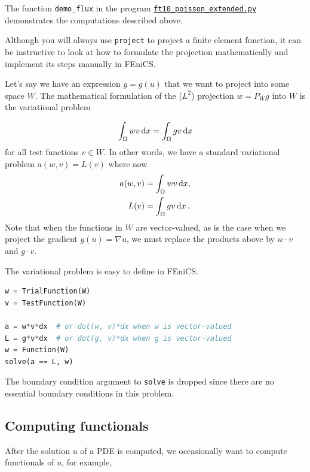 \documentclass[graybox,envcountchap,sectrefs,final]{svmonodo}
\newenvironment{notice_mdfboxadmon}[1][]{
\begin{notice_mdfboxmdframed}[frametitle=#1]
}
{
\end{notice_mdfboxmdframed}
}
\begin{document}
The function \Verb!demo_flux! in the program
\href{{https://fenicsproject.org/pub/tutorial/python/vol1/ft10_poisson_extended.py}}{\nolinkurl{ft10_poisson_extended.py}}
demonstrates the computations described above.


\begin{notice_mdfboxadmon}
Although you will always use \texttt{project} to project a finite element
function, it can be instructive to look at how to formulate the
projection mathematically and implement its steps manually in FEniCS.

Let's say we have an expression $g = g(u)$ that we want to project
into some space $W$. The mathematical formulation of the ($L^2$)
projection $w = P_W g$ into $W$ is the variational problem

\begin{equation}
  \int_{\Omega} w v \, \mathrm{d}x = \int_{\Omega} g v \, \mathrm{d}x
\end{equation}
for all test functions $v\in W$. In other words, we have a
standard variational problem $a(w, v) = L(v)$ where now
\begin{align}
a(w, v) &= \int_\Omega w v \, \mathrm{d}x,\\
L(v) &= \int_\Omega g v \, \mathrm{d}x\thinspace .
\end{align}
Note that when the functions in $W$ are vector-valued, as is the case
when we project the gradient $g(u) = \nabla u$, we must replace the
products above by $w\cdot v$ and $g\cdot v$.

The variational problem is easy to define in FEniCS.
\begin{lstlisting}[language=Python,style=graycolor]
w = TrialFunction(W)
v = TestFunction(W)

a = w*v*dx  # or dot(w, v)*dx when w is vector-valued
L = g*v*dx  # or dot(g, v)*dx when g is vector-valued
w = Function(W)
solve(a == L, w)
\end{lstlisting}
The boundary condition argument to \texttt{solve} is dropped since there are
no essential boundary conditions in this problem.
\end{notice_mdfboxadmon} %

\subsection{Computing functionals}
\label{ch:poisson0:functionals}

After the solution $u$ of a PDE is computed, we occasionally want to compute
functionals of $u$, for example,
\end{document}
